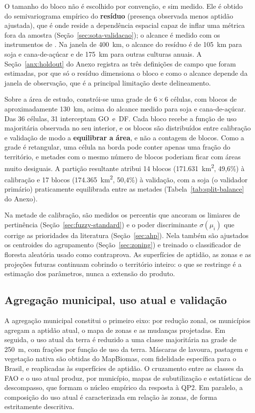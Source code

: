 O tamanho do bloco não é escolhido por convenção, e sim medido. Ele é obtido do semivariograma empírico
do \textbf{resíduo} (presença observada menos aptidão ajustada), que é onde reside a dependência
espacial capaz de inflar uma métrica fora da amostra (Seção~\ref{sec:sota-validacao}); o alcance é
medido com os instrumentos de \citet[p.~225]{valavi_blockcv_2019}. Na janela de 400~km, o alcance do
resíduo é de 105~km para soja e cana-de-açúcar e de 175~km para outras culturas anuais. A
Seção~\ref{anx:holdout} do Anexo registra as três definições de campo que foram estimadas, por que só
o resíduo dimensiona o bloco e como o alcance depende da janela de observação, que é a principal
limitação deste delineamento.

Sobre a área de estudo, constrói-se uma grade de $6 \times 6$ células, com blocos de aproximadamente
130~km, acima do alcance medido para soja e cana-de-açúcar. Das 36 células, 31 interceptam GO~e~DF.
Cada bloco recebe a função de uso majoritária observada no seu interior, e os blocos são distribuídos
entre calibração e validação de modo a \textbf{equilibrar a área}, e não a contagem de blocos. Como a
grade é retangular, uma célula na borda pode conter apenas uma fração do território, e metades com o
mesmo número de blocos poderiam ficar com áreas muito desiguais. A partição resultante atribui
14 blocos (171.631~km\textsuperscript{2}, 49,6\%) à calibração e 17 blocos
(174.365~km\textsuperscript{2}, 50,4\%) à validação, com a soja (o validador primário) praticamente
equilibrada entre as metades (Tabela~\ref{tab:split-balance} do Anexo).

Na metade de calibração, são medidos os percentis que ancoram os limiares de pertinência
(Seção~\ref{sec:fuzzy-standard}) e o poder discriminante $\sigma(\mu_i)$ que corrige as prioridades da
literatura (Seção~\ref{sec:ahp}). Nela também são ajustados os centroides do agrupamento
(Seção~\ref{sec:zoning}) e treinado o classificador de floresta aleatória usado como contraprova.
As superfícies de aptidão, as zonas e as projeções futuras continuam cobrindo o território
inteiro: o que se restringe é a estimação dos parâmetros, nunca a extensão do produto.

\subsection{Agregação municipal, uso atual e validação}\label{sec:phaseb-aggr}

A agregação municipal constitui o primeiro eixo: por redução zonal, os municípios agregam a
aptidão atual, o mapa de zonas e as mudanças projetadas. Em seguida, o uso atual da terra é
reduzido a uma classe majoritária na grade de 250~m, com frações por função de uso da terra.
Máscaras de lavoura, pastagem e vegetação nativa são obtidas do MapBiomas, com fidelidade
específica para o Brasil, e reaplicadas às superfícies de aptidão. O cruzamento entre as classes
da FAO e o uso atual produz, por município, mapas de subutilização e estatísticas de descompasso, que
formam o núcleo empírico da resposta à QP2. Em paralelo, a composição do uso atual é caracterizada em
relação às zonas, de forma estritamente descritiva.

